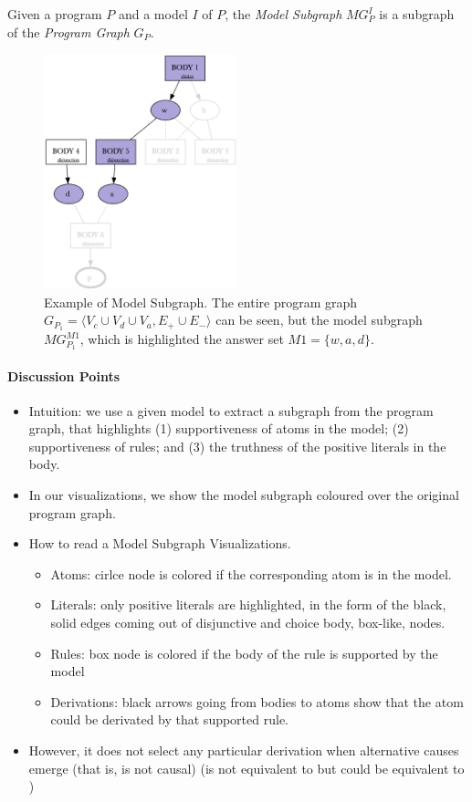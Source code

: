 %
\begin{proposition}
  Given a program $P$ and a model $I$ of $P$,
  the \emph{Model Subgraph} $MG_P^I$ is a subgraph of the \emph{Program Graph} $G_P$.
\end{proposition}
%
\begin{figure}
  \centering
  \includegraphics[width=0.5\textwidth]{resources/mask.png}
  \caption{Example of Model Subgraph.
  The entire program graph $G_{P_{1}} = \langle V_c \cup V_d \cup V_a, E_{+}\cup E_{-} \rangle$ can be seen, but the model subgraph $MG_{P_1}^{M1}$, which is highlighted  the answer set $M1 = \{w,a,d\}$.}
  \label{fig:model-mask}
\end{figure}


\paragraph{Discussion Points}
\begin{itemize}
  \item Intuition: we use a given model to extract a subgraph from the program graph, that highlights (1) supportiveness of atoms in the model; (2) supportiveness of rules; and (3) the truthness of the positive literals in the body.
  \item In our visualizations, we show the model subgraph coloured over the original program graph.
  \item How to read a Model Subgraph Visualizations.
  \begin{itemize}
    \item Atoms: cirlce node is colored if the corresponding atom is in the model.
    \item Literals: {\color{blue} only positive} literals are highlighted, in the form of the black, solid edges coming out of disjunctive and choice body, box-like, nodes.
    \item Rules: box node is colored if the body of the rule is supported by the model
    \item Derivations: black arrows going from bodies to atoms show that the atom could be derivated by that supported rule.
  \end{itemize}
  \item However, it {\color{blue} does not select any particular derivation} when alternative causes emerge (that is, is not causal) (is not equivalent to \cite{cabmun24a} but could be equivalent to \cite{altrsoba23a})
\end{itemize}

